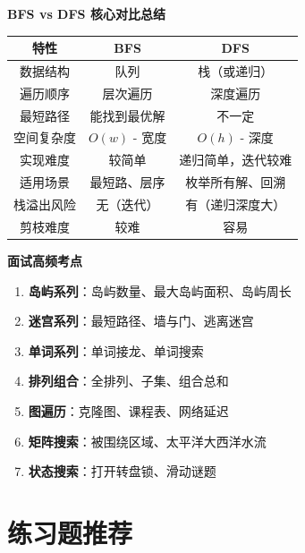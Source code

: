 \documentclass[12pt,a4paper]{article}
\begin{document}
	\begin{greenbox}
		\textbf{BFS vs DFS 核心对比总结}
		
		\begin{center}
			\begin{tabular}{|c|c|c|}
				\hline
				\textbf{特性} & \textbf{BFS} & \textbf{DFS} \\
				\hline
				数据结构 & 队列 & 栈（或递归） \\
				\hline
				遍历顺序 & 层次遍历 & 深度遍历 \\
				\hline
				最短路径 & 能找到最优解 & 不一定 \\
				\hline
				空间复杂度 & $O(w)$ - 宽度 & $O(h)$ - 深度 \\
				\hline
				实现难度 & 较简单 & 递归简单，迭代较难 \\
				\hline
				适用场景 & 最短路、层序 & 枚举所有解、回溯 \\
				\hline
				栈溢出风险 & 无（迭代） & 有（递归深度大） \\
				\hline
				剪枝难度 & 较难 & 容易 \\
				\hline
			\end{tabular}
		\end{center}
	\end{greenbox}
	
	\begin{purplebox}
		\textbf{面试高频考点}
		
		\begin{enumerate}
			\item \textbf{岛屿系列}：岛屿数量、最大岛屿面积、岛屿周长
			\item \textbf{迷宫系列}：最短路径、墙与门、逃离迷宫
			\item \textbf{单词系列}：单词接龙、单词搜索
			\item \textbf{排列组合}：全排列、子集、组合总和
			\item \textbf{图遍历}：克隆图、课程表、网络延迟
			\item \textbf{矩阵搜索}：被围绕区域、太平洋大西洋水流
			\item \textbf{状态搜索}：打开转盘锁、滑动谜题
		\end{enumerate}
	\end{purplebox}
	
	\section{练习题推荐}
	
\end{document}
